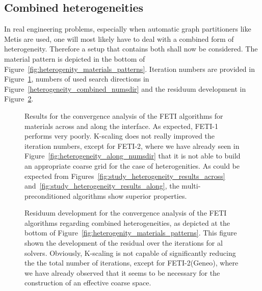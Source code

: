 \FloatBarrier
\subsection{Combined heterogeneities}\label{sec:heterogeneities_combined}
In real engineering problems, especially when automatic graph partitioners like Metis are used, one will most likely have to deal with a combined form of heterogeneity. Therefore a setup that contains both shall now be considered. The material pattern is depicted in the bottom of Figure~\ref{fig:heterogenity_materials_patterns}. Iteration numbers are provided in Figure~\ref{fig:study_heterogenity_combined}, numbers of used search directions in Figure~\ref{heterogeneity_combined_numsdir} and the residuum development in Figure~\ref{fig:heterogeneity_cboard_residuum}.


\begin{figure}[tb]
  \begin{center}
    
    \caption[Study of combined heterogeneities: \#iterations]{Results for the convergence analysis of the FETI algorithms for materials across and along the interface. As expected, FETI-1 performs very poorly. K-scaling does not really improved the iteration numbers, except for FETI-2, where we have already seen in Figure~\ref{fig:heterogeneity_along_numsdir} that it is not able to build an appropriate coarse grid for the case of heterogenities. As could be expected from Figures~\ref{fig:study_heterogeneity_results_across} and~\ref{fig:study_heterogeneity_results_along}, the multi-preconditioned algorithms show superior properties.}
    \label{fig:study_heterogenity_combined}
  \end{center}
\end{figure}

\begin{figure}
  \begin{center}
    
    \caption[Study of combined heterogeneities: residua]{Residuum development for the convergence analysis of the FETI algorithms regarding combined heterogeneities, as depicted at the bottom of Figure~\ref{fig:heterogenity_materials_patterns}. This figure shown the development of the residual over the iterations for al solvers. Obviously, K-scaling is not capable of significantly reducing the the total number of iterations, except for FETI-2(Geneo), where we have already observed that it seems to be necessary for the construction of an effective coarse space.}
    \label{fig:heterogeneity_cboard_residuum}
  \end{center}
\end{figure}

